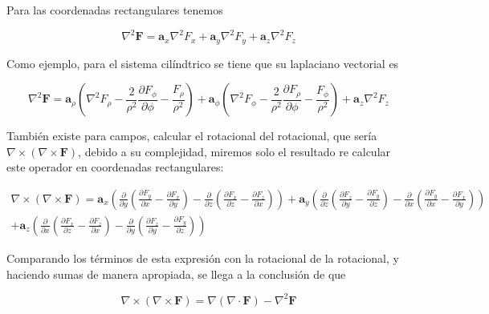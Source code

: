 Para las coordenadas rectangulares tenemos

\begin{equation*}
\nabla^2 \mathbf{F} = \mathbf{a}_x \nabla^2 F_x + \mathbf{a}_y \nabla^2 F_y + \mathbf{a}_z \nabla^2 F_z 
\end{equation*}

Como ejemplo, para el sistema cilíndtrico se tiene que su laplaciano vectorial es

\begin{equation*}
\nabla^2 \mathbf{F} = \mathbf{a}_\rho \left( \nabla^2 F_\rho - \frac{2}{\rho^2} \frac{\partial F_\phi}{\partial \phi} - \frac{F_\rho}{\rho^2} \right) + \mathbf{a}_\phi \left( \nabla^2 F_\phi  - \frac{2}{\rho^2} \frac{\partial F_\rho}{\partial \phi} - \frac{F_\phi}{\rho^2} \right)+ \mathbf{a}_z \nabla^2 F_z 
\end{equation*}

También existe para campos, calcular el rotacional del rotacional, que sería $\nabla  \times (\nabla \times \mathbf{F})$, debido a su complejidad, miremos solo el resultado re calcular este operador en coordenadas rectangulares:

\begin{eqnarray*}
\nabla \times (\nabla \times \mathbf{F}) = \mathbf{a}_x \left( \frac{\partial  }{\partial y } \left( \frac{\partial F_y }{\partial x } - \frac{\partial F_x }{\partial y } \right) - \frac{\partial  }{\partial z } \left( \frac{\partial F_x }{\partial z} - \frac{\partial F_z }{\partial x } \right) \right) + \mathbf{a}_y \left( \frac{\partial  }{\partial z } \left( \frac{\partial F_z }{\partial y } - \frac{\partial F_y }{\partial z } \right) - \frac{\partial  }{\partial x } \left( \frac{\partial F_y }{\partial x } - \frac{\partial F_x }{\partial y } \right) \right) \\
+ \mathbf{a}_z \left( \frac{\partial  }{\partial x } \left( \frac{\partial F_x }{\partial z } - \frac{\partial F_z }{\partial x } \right) - \frac{\partial  }{\partial y } \left( \frac{\partial F_z }{\partial y } - \frac{\partial F_y }{\partial z } \right) \right)
\end{eqnarray*}

Comparando los términos de esta expresión con la rotacional de la rotacional, y haciendo sumas de manera apropiada, se llega a la conclusión de que 

\begin{equation*}
\nabla \times (\nabla \times \mathbf{F}) = \nabla (\nabla \cdot \mathbf{F}) - \nabla^2 \mathbf{F}
\end{equation*}

